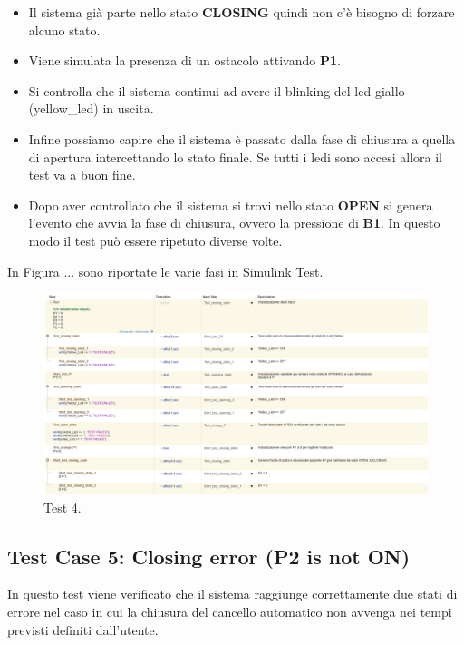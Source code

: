 \documentclass[12pt]{article}
\begin{document}
\begin{itemize}
    \item Il sistema già parte nello stato \textbf{CLOSING} quindi non c'è bisogno di forzare alcuno stato.
    \item Viene simulata la presenza di un ostacolo attivando \textbf{P1}.
    \item Si controlla che il sistema continui ad avere il blinking del led giallo (yellow\_led) in uscita.
    \item Infine possiamo capire che il sistema è passato dalla fase di chiusura a quella di apertura intercettando lo stato finale. Se tutti i ledi sono accesi allora il test va a buon fine. 
    \item Dopo aver controllato che il sistema si trovi nello stato \textbf{OPEN} si genera l'evento che avvia la fase di chiusura, ovvero la pressione di \textbf{B1}. In questo modo il test può essere ripetuto diverse volte.
\end{itemize}

In Figura ... sono riportate le varie fasi in Simulink Test.
\begin{figure}[H]
    
    \hspace{-2.3cm} %
    \includegraphics[width=1.3\textwidth]{Immagini_Test/Test_4_img.PNG}
    \caption{Test 4.}
    \label{fig:Test_4}
\end{figure}

\subsection{Test Case 5: Closing error (P2 is not ON)}
In questo test viene verificato che il sistema raggiunge correttamente due stati di errore nel caso in cui la chiusura del cancello automatico non avvenga nei tempi previsti definiti dall'utente.
\end{document}
